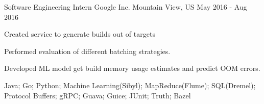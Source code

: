 

\begin{cventries}


  \cventry
    {Software Engineering Intern} %
    {Google Inc.} %
    {Mountain View, US} %
    {May 2016 - Aug 2016} %
    {
      \begin{cvitems} %
        \item {Created service to generate builds out of targets}
        \item {Performed evaluation of different batching strategies.}
        \item {Developed ML model get build memory usage estimates and predict OOM errors.}
        \item {Java; Go; Python; Machine Learning(Sibyl); MapReduce(Flume); SQL(Dremel); Protocol Buffers; gRPC; Guava; Guice; JUnit; Truth; Bazel}
      \end{cvitems}
    }

\end{cventries}